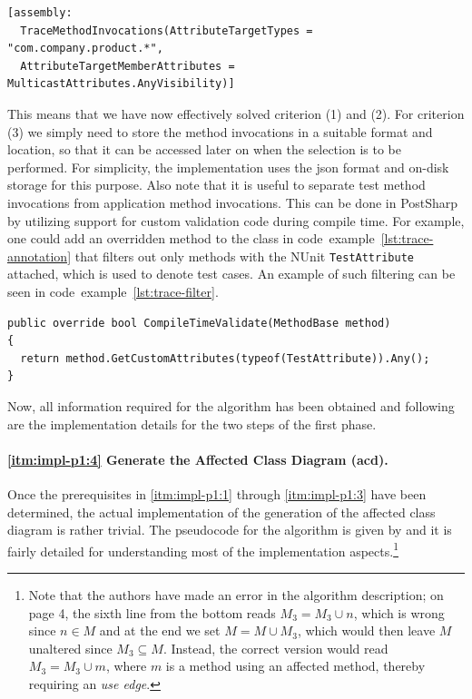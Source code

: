 \documentclass[a4paper,english,12pt]{report}
\newcommand{\textcf}{\texttt}
\begin{document}
\begin{listing}[htbp]
{\footnotesize
\begin{verbatim}
[assembly: 
  TraceMethodInvocations(AttributeTargetTypes = "com.company.product.*", 
  AttributeTargetMemberAttributes = MulticastAttributes.AnyVisibility)]
\end{verbatim}
}
\caption{Attachment of a trace attribute to an assembly.}
\label{lst:trace-assembly}
\end{listing}

This means that we have now effectively solved criterion (1) and (2). For criterion (3) we simply need to store the method invocations in a suitable format and location, so that it can be accessed later on when the selection is to be performed. For simplicity, the implementation uses the \gls{json} format and on-disk storage for this purpose. Also note that it is useful to separate test method invocations from application method invocations. This can be done in PostSharp by utilizing support for custom validation code during compile time. For example, one could add an overridden method to the class in code~example~\vref{lst:trace-annotation} that filters out only methods with the NUnit \textcf{TestAttribute} attached, which is used to denote test cases. An example of such filtering can be seen in code~example~\vref{lst:trace-filter}.

\begin{listing}[htbp]
{\footnotesize
\begin{verbatim}
public override bool CompileTimeValidate(MethodBase method)
{
  return method.GetCustomAttributes(typeof(TestAttribute)).Any();
}
\end{verbatim}
}
\caption{Filtering out attachment methods that are not test cases.}
\label{lst:trace-filter}
\end{listing}

Now, all information required for the algorithm has been obtained and following are the implementation details for the two steps of the first phase.

\paragraph{\ref{itm:impl-p1:4} Generate the Affected Class Diagram (\gls{acd}).}
Once the prerequisites in \ref{itm:impl-p1:1} through \ref{itm:impl-p1:3} have been determined, the actual implementation of the generation of the affected class diagram is rather trivial. The pseudocode for the algorithm is given by \citet[p. 4]{mansour2009regression} and it is fairly detailed for understanding most of the implementation aspects.\footnote{Note that the authors have made an error in the algorithm description; on page 4, the sixth line from the bottom reads $M_3 = M_3 \cup n$, which is wrong since $n \in M$ and at the end we set $M = M \cup M_3$, which would then leave $M$ unaltered since $M_3 \subseteq M$. Instead, the correct version would read $M_3 = M_3 \cup m$, where $m$ is a method using an affected method, thereby requiring an \textit{use edge}.}
\end{document}
